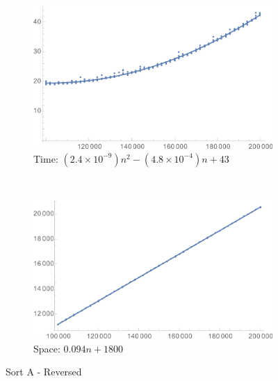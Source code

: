 \documentclass[a4paper]{scrartcl}
\begin{document}
\begin{figure}[p]
    \centering
    \begin{subfigure}[b]{0.45\textwidth}
        \includegraphics[width = \textwidth]{sortA_reverse_time.png}
        \caption{Time: \((2.4 \times 10^{-9}) n^2 - (4.8 \times 10^{-4}) n + 43\)}
    \end{subfigure}
    ~
    \begin{subfigure}[b]{0.45\textwidth}
        \includegraphics[width = \textwidth]{sortA_reverse_space.png}
        \caption{Space: \(0.094 n + 1800\)}
    \end{subfigure}
    \caption{Sort A - Reversed}
    \label{fig:sortA_reverse}
\end{figure}
\end{document}

